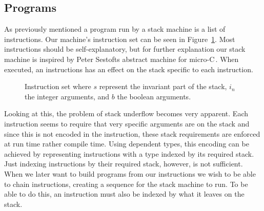 \subsection{Programs}
\label{sec:program}
As previously mentioned a program run by a stack machine is a list of instructions. Our machine's instruction set can be seen in Figure~\ref{fig:inst_set}. Most instructions should be self-explanatory, but for further explanation our stack machine is inspired by Peter Sestofts abstract machine for micro-C\,\cite[pp. 157--161]{Sestoft:PLC}. When executed, an instructions has an effect on the stack specific to each instruction.

\begin{figure}
\caption{Instruction set where $s$ represent the invariant part of the stack, $i_n$ the integer arguments, and $b$ the boolean arguments.}
\label{fig:inst_set}
\end{figure}

Looking at this, the problem of stack underflow becomes very apparent. Each instruction seems to require that very specific arguments are on the stack and since this is not encoded in the instruction, these stack requirements are enforced at run time rather compile time. Using dependent types, this encoding can be achieved by representing instructions with a type indexed by its required stack. Just indexing instructions by their required stack, however, is not sufficient. When we later want to build programs from our instructions we wish to be able to chain instructions, creating a sequence for the stack machine to run. To be able to do this, an instruction must also be indexed by what it leaves on the stack. 

